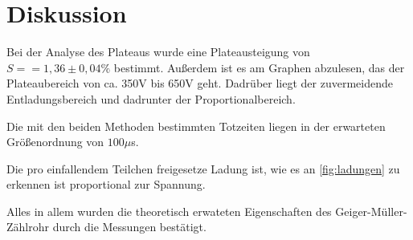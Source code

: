 \documentclass[titlepage = firstcover]{scrartcl}
\begin{document}
    \newpage
    \section{Diskussion}
      Bei der Analyse des Plateaus wurde eine Plateausteigung von $S = = 1,36 \pm 0,04 \%$ bestimmt. Außerdem ist es am Graphen abzulesen, das der Plateaubereich von ca. 350V bis 650V geht. Dadrüber liegt der zuvermeidende Entladungsbereich und dadrunter der Proportionalbereich.

      Die mit den beiden Methoden bestimmten Totzeiten liegen in der erwarteten Größenordnung von $100 \mu$s.

      Die pro einfallendem Teilchen freigesetze Ladung ist, wie es an \autoref{fig:ladungen} zu erkennen ist proportional zur Spannung.

      Alles in allem wurden die theoretisch erwateten Eigenschaften des Geiger-Müller-Zählrohr durch die Messungen bestätigt.

          
    \newpage
\end{document}
